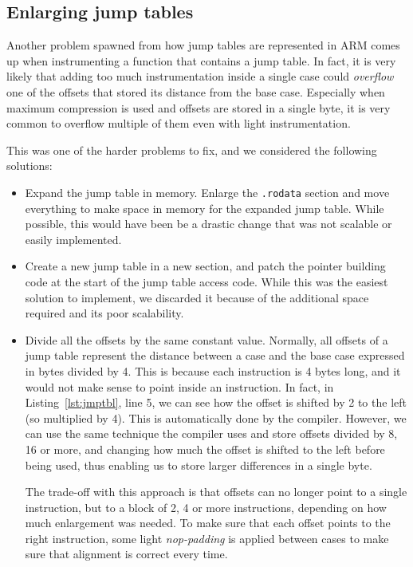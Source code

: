 \documentclass[a4paper,11pt,oneside]{report}
\begin{document}
\subsection{Enlarging jump tables}
Another problem spawned from how jump tables are represented in ARM comes up 
when instrumenting a function that contains a jump table. In fact, it is very 
likely that adding too much instrumentation inside a single case could 
\emph{overflow} one of the offsets that stored its distance from the base case.
Especially when maximum compression is used and offsets are stored in a single 
byte, it is very common to overflow multiple of them even with light 
instrumentation. 

This was one of the harder problems to fix, and we considered the following 
solutions:
\begin{itemize}
	\item Expand the jump table in memory. Enlarge the \texttt{.rodata} section 
		and move everything to make space in memory for the expanded jump 
		table. While possible, this would have been be a drastic change that 
		was not scalable or easily implemented.
	\item Create a new jump table in a new section, and patch the pointer 
		building code at the start of the jump table access code. While this 
		was the easiest solution to implement, we discarded it because of the 
		additional space required and its poor scalability.
	\item Divide all the offsets by the same constant value. Normally, all 
		offsets of a jump table represent the distance between a case and the 
		base case expressed in bytes divided by 4. This is because each 
		instruction is 4 bytes long, and it would not make sense to point 
		inside an instruction. In fact, in Listing~\ref{lst:jmptbl}, line 5, we 
		can see how the offset is shifted by 2 to the left (so multiplied by 
		4). This is automatically done by the compiler. However, we can use the 
		same technique the compiler uses and store offsets divided by 8, 16 or 
		more, and changing how much the offset is shifted to the left before 
		being used, thus enabling us to store larger differences in a single 
		byte. 

		The trade-off with this approach is that offsets can no longer point to 
		a single instruction, but to a block of 2, 4 or more instructions, 
		depending on how much enlargement was needed. To make sure that each 
		offset points to the right instruction, some light \emph{nop-padding} 
		is applied between cases to make sure that alignment is correct every 
		time.
\end{itemize}
\end{document}
